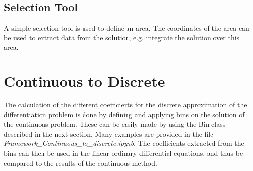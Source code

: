 \documentclass[11pt, oneside]{article}   	%
\begin{document}
\subsection{Selection Tool}
A simple selection tool is used to define an area. The coordinates of the area can be used to extract data from the solution, e.g. integrate the solution over this area. 


\section{Continuous to Discrete}
The calculation of the different coefficients for the discrete approximation of the differentiation problem is done by defining and applying bins on the solution of the continuous problem. These can be easily made by using the Bin class described in the next section. Many examples are provided in the file \textit{Framework\_Continuous\_to\_discrete.ipynb}. The coefficients extracted from the bins can then be used in the linear ordinary differential equations, and thus be compared to the results of the continuous method.
\end{document}
